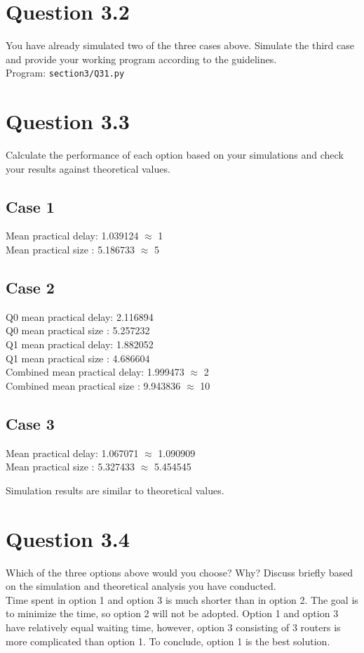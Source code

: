 \documentclass{article}
\newenvironment{homeworkProblem}[1]{
	\section*{#1}
	}{
}
\newenvironment{homeworkSection}[1]{
	\subsection*{#1}
	}{
}
\begin{document}

\begin{homeworkProblem}{Question 3.2}
You have already simulated two of the three cases above. Simulate the third case and provide your working program according to the guidelines.\\

Program: \texttt{section3/Q31.py}
\end{homeworkProblem}


\begin{homeworkProblem}{Question 3.3}
Calculate the performance of each option based on your simulations and check your results against theoretical values.

\begin{homeworkSection}{Case 1}
Mean practical delay: 1.039124 $\approx$ 1\\
Mean practical size : 5.186733 $\approx$ 5
\end{homeworkSection}

\begin{homeworkSection}{Case 2}
Q0 mean practical delay: 2.116894\\
Q0 mean practical size : 5.257232\\
Q1 mean practical delay: 1.882052\\
Q1 mean practical size : 4.686604\\
Combined mean practical delay: 1.999473 $\approx$ 2\\
Combined mean practical size : 9.943836 $\approx$ 10
\end{homeworkSection}

\begin{homeworkSection}{Case 3}
Mean practical delay: 1.067071 $\approx$ 1.090909\\
Mean practical size : 5.327433 $\approx$ 5.454545\\
\end{homeworkSection}

Simulation results are similar to theoretical values.

\end{homeworkProblem}


\begin{homeworkProblem}{Question 3.4}
Which of the three options above would you choose? Why? Discuss briefly based on the simulation and theoretical analysis you have conducted.\\

Time spent in option 1 and option 3 is much shorter than in option 2. The goal is to minimize the time, so option 2 will not be adopted. Option 1 and option 3 have relatively equal waiting time, however, option 3 consisting of 3 routers is more complicated than option 1. To conclude, option 1 is the best solution.
\end{homeworkProblem}
\end{document}
